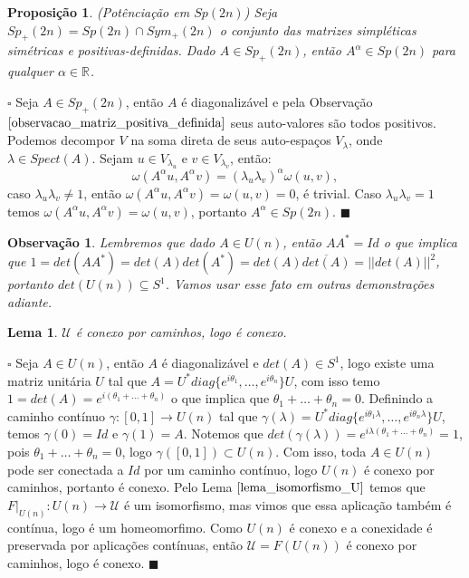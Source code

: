 \documentclass[12pt]{book}
\newtheorem{lema}[teorema]{Lema}
\newtheorem{observacao}[teorema]{Observação}
\newtheorem{proposicao}[teorema]{Proposição}
\newenvironment{prova}[1]{$\square$ #1}{\hfill$\blacksquare$}
\newcommand{\espectro}[1]{Spect(#1)}
\newcommand{\gruposimpletico}[1]{Sp(#1)}
\newcommand{\gruposimpleticopositivo}[1]{Sp_{+}(#1)}
\newcommand{\matrizsimetricapositiva}[1]{Sym_{+}(#1)}
\newcommand{\matrizunitaria}[1]{U(#1)}
\newcommand{\real}[1]{\mathbb{R}^{#1}}
\begin{document}
	\begin{proposicao}\label{proposicao_potenciacao_grupo_simpletico}
		(Potênciação em $\gruposimpletico{2n}$) Seja $\gruposimpleticopositivo{2n} = \gruposimpletico{2n} \cap \matrizsimetricapositiva{2n}$ o conjunto das matrizes simpléticas simétricas e positivas-definidas. Dado $A \in \gruposimpleticopositivo{2n}$, então $A^{\alpha} \in \gruposimpletico{2n}$ para qualquer $\alpha \in \real{}$.
	\end{proposicao}
	\begin{prova}
		Seja $A \in \gruposimpleticopositivo{2n}$, então $A$ é diagonalizável e pela Observação $\ref{observacao_matriz_positiva_definida}$ seus auto-valores são todos positivos. Podemos decompor $V$ na soma direta de seus auto-espaços $V_{\lambda}$, onde $\lambda \in \espectro{A}$. Sejam $u \in V_{\lambda_{u}}$ e $v \in V_{\lambda_{v}}$, então:
		$$
		\omega(A^{\alpha}u,A^{\alpha}v) = 		(\lambda_{u}\lambda_{v})^{\alpha}\omega(u,v), 
		$$
		caso $\lambda_{u}\lambda_{v}\neq 1$, então $\omega(A^{\alpha}u,A^{\alpha}v)=\omega(u,v)=0$, é trivial. Caso $\lambda_{u}\lambda_{v}=1$ temos $\omega(A^{\alpha}u,A^{\alpha}v) = \omega(u,v)$, portanto $A^{\alpha} \in \gruposimpletico{2n}$.
	\end{prova}
	
	\begin{observacao}\label{observacao_determinante_matriz_unitaria}
		Lembremos que dado $A \in \matrizunitaria{n}$, então $AA^{*} = Id$ o que implica que $1= det(AA^{*}) = det(A)det(A^{*}) = det(A)\overline{det(A)} = ||det(A)||^{2}$, portanto $det(\matrizunitaria{n}) \subseteq S^{1}$. Vamos usar esse fato em outras demonstrações adiante.
	\end{observacao}
	
	
	\begin{lema}
		$\mathcal{U}$ é conexo por caminhos, logo é conexo.
	\end{lema}
	\begin{prova}
		Seja $A \in \matrizunitaria{n}$, então $A$ é diagonalizável e $det(A) \in S^{1}$, logo existe uma matriz unitária $U$ tal que $A=U^{*}diag\{e^{i\theta_{1}}, \dots, e^{i\theta_{n}}\}U$, com isso temo $1 = det(A) = e^{i(\theta_{1}+\dots+\theta_{n})}$ o que implica que $\theta_{1}+\dots+\theta_{n}=0$. Definindo a caminho contínuo $\gamma:[0,1] \to \matrizunitaria{n}$ tal que $\gamma(\lambda)=U^{*}diag\{e^{i\theta_{1}\lambda}, \dots, e^{i\theta_{n}\lambda}\}U$, temos $\gamma(0)=Id$ e $\gamma(1)=A$. Notemos que $det(\gamma(\lambda)) = e^{i\lambda(\theta_{1}+\dots+\theta_{n})} = 1$, pois $\theta_{1}+\dots+\theta_{n}=0$, logo $\gamma([0,1]) \subset \matrizunitaria{n}$. Com isso, toda $A \in \matrizunitaria{n}$ pode ser conectada a $Id$ por um caminho contínuo, logo $\matrizunitaria{n}$ é conexo por caminhos, portanto é conexo. Pelo Lema $\ref{lema_isomorfismo_U}$ temos que $F|_{\matrizunitaria{n}}:\matrizunitaria{n} \to \mathcal{U}$ é um isomorfismo, mas vimos que essa aplicação também é contínua, logo é um homeomorfimo. Como $\matrizunitaria{n}$ é conexo e a conexidade é preservada por aplicações contínuas, então $\mathcal{U} = F(\matrizunitaria{n})$ é conexo por caminhos, logo é conexo.
	\end{prova}
\end{document}
